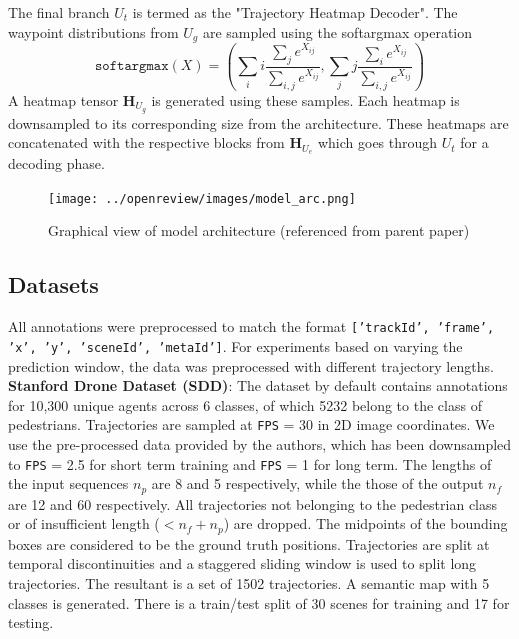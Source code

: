 The final branch $U_{t}$ is termed as the "Trajectory Heatmap Decoder". The waypoint distributions from $U_g$ are sampled using the softargmax operation 
$$\mathtt{softargmax}(X)=\left(
\displaystyle\sum_ii
\frac{\sum_je^{X_{ij}}}{\sum_{i,j}e^{X_{ij}}},
\displaystyle\sum_jj\frac{\sum_ie^{X_{ij}}}{\sum_{i,j}e^{X_{ij}}}\right)$$A heatmap tensor $\mathbf{H}_{U_g}$ is generated using these samples. Each heatmap is downsampled to its corresponding size from the architecture. These heatmaps are concatenated with the respective blocks from $\mathbf{H}_{U_e}$ which goes through $U_t$ for a decoding phase.

\begin{figure}[htp]
    \centering
    \texttt{[image: ../openreview/images/model\_arc.png]}
    \caption{Graphical view of model architecture (referenced from parent paper) }
    \label{fig:galaxy}
\end{figure}


\subsection{Datasets}
All annotations were preprocessed to match the format \texttt{['trackId', 'frame', 'x', 'y', 'sceneId', 'metaId']}. For experiments based on varying the prediction window, the data was preprocessed with different trajectory lengths.\\

\textbf{Stanford Drone Dataset (SDD)}: \cite{Robicquet2016LearningSE} The dataset by default contains annotations for 10,300 unique agents across 6 classes, of which 5232 belong to the class of pedestrians. Trajectories are sampled at \texttt{FPS} = 30 in 2D image coordinates. We use the pre-processed data provided by the authors, which has been downsampled to \texttt{FPS} = 2.5 for short term training and \texttt{FPS} = 1 for long term. The lengths of the input sequences $n_p$ are 8 and 5 respectively, while the those of the output $n_f$ are 12 and 60 respectively. All trajectories not belonging to the pedestrian class or of insufficient length ($<n_f+n_p$) are dropped. The midpoints of the bounding boxes are considered to be the ground truth positions. Trajectories are split at temporal discontinuities and a staggered sliding window is used to split long trajectories. The resultant is a set of 1502 trajectories. A semantic map with 5 classes is generated. There is a train/test split of 30 scenes for training and 17 for testing.\\


